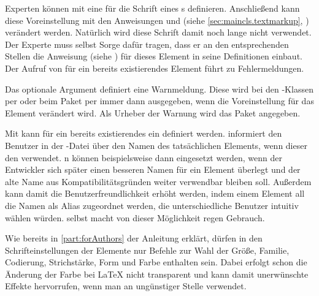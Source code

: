 
\begin{Declaration}
\end{Declaration}
Experten können mit  eine  für die
Schrift eines s definieren. Anschließend kann diese
Voreinstellung mit den Anweisungen  und
 (siehe \autoref{sec:maincls.textmarkup},
) verändert werden. Natürlich wird diese
Schrift damit noch lange nicht verwendet. Der Experte muss selbst Sorge dafür
tragen, dass er an den entsprechenden Stellen die Anweisung
%
 (siehe
) für dieses Element in seine
Definitionen einbaut. Der Aufruf von  für ein bereits
existierendes Element führt zu Fehlermeldungen.

Das optionale Argument  definiert eine Warnmeldung. Diese wird
bei den \KOMAScript-Klassen per  oder beim Paket
 per  immer dann ausgegeben, wenn die
Voreinstellung für das Element verändert wird. Als Urheber der
Warnung wird das Paket
angegeben.

Mit  kann für ein bereits existierendes 
ein  definiert werden. \KOMAScript{} informiert den Benutzer
in der -Datei über den Namen des tatsächlichen Elements, wenn dieser
den  verwendet. n können
beispielsweise dann eingesetzt werden, wenn der Entwickler sich später einen
besseren Namen für ein Element überlegt und der alte Name aus
Kompatibilitätsgründen weiter verwendbar bleiben soll. Außerdem kann damit die
Benutzerfreundlichkeit erhöht werden, indem einem Element all die Namen als
Alias zugeordnet werden, die unterschiedliche Benutzer intuitiv wählen
würden. \KOMAScript{} selbst macht von dieser Möglichkeit regen Gebrauch.
%
\EndIndexGroup


\begin{Declaration}
\end{Declaration}
Wie bereits in \autoref{part:forAuthors} der Anleitung erklärt, dürfen in den
Schrifteinstellungen der Elemente nur Befehle zur Wahl der Größe, Familie,
Codierung, Strichstärke, Form und Farbe enthalten sein. Dabei erfolgt schon
die Änderung der Farbe bei \LaTeX{} nicht transparent und kann damit
unerwünschte Effekte hervorrufen, wenn man 
an ungünstiger Stelle verwendet.

